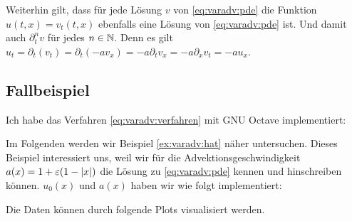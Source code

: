 Weiterhin gilt, dass für jede Lösung $v$ von \eqref{eq:varadv:pde} die Funktion $u(t,x) = v_t(t,x)$ ebenfalls eine Lösung von \eqref{eq:varadv:pde} ist.
Und damit auch $\partial^n_t v$ für jedes $n \in \mathbb N$.
Denn es gilt $u_t = \partial_t (v_t) = \partial_t(- a v_x) = - a \partial_t v_x = -a \partial_x v_t = -a u_x$.

\subsection{Fallbeispiel}

Ich habe das Verfahren \eqref{eq:varadv:verfahren} mit GNU Octave implementiert:
\vspace{0.4cm}

Im Folgenden werden wir Beispiel \ref{ex:varadv:hat} näher untersuchen.
Dieses Beispiel interessiert uns, weil wir für die Advektionsgeschwindigkeit $a(x) = 1 + \varepsilon (1 - \left| x \right|)$ die Lösung zu \eqref{eq:varadv:pde} kennen und hinschreiben können.
$u_0(x)$ und $a(x)$ haben wir wie folgt implementiert:


Die Daten können durch folgende Plots visualisiert werden.
\vspace{0.4cm}

\hspace{-1cm}

